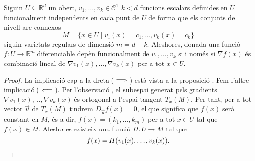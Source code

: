 \documentclass[../Apunts.tex]{subfiles}
\begin{document}
	\begin{proposition}
		Siguin \(U\subseteq\mathbb{R}^{d}\) un obert, \(v_{1},\dots,v_{k}\in\mathcal{C}^{1}\) \(k<d\) funcions escalars definides en \(U\) funcionalment independents en cada punt de \(U\) de forma que els conjunts de nivell arc-connexos
		\[M=\{x\in U\mid v_{1}(x)=c_{1},\dots,v_{k}(x)=c_{k}\}\]
		siguin varietats regulars de dimensió \(m=d-k\). Aleshores, donada una funció \(f\colon U\to\mathbb{R}^{m}\) diferenciable depèn funcionalment de \(v_{1},\dots,v_{k}\) si i només si \(\nabla f(x)\) és combinació lineal de \(\nabla v_{1}(x),\dots,\nabla v_{k}(x)\) per a tot \(x\in U\).
		\begin{proof}
			La implicació cap a la dreta (\(\implies\)) està vista a la proposició . Fem l'altre implicació (\(\impliedby\)).
			Per l'observació , el subespai generat pels gradients \(\nabla v_{1}(x),\dots,\nabla v_{k}(x)\) és ortogonal a l'espai tangent \(T_{x}(M)\). Per tant, per a tot vector \(\vec{u}\) de \(T_{x}(M)\) tindrem \(D_{\vec{u}}f(x)=0\), el que significa que \(f(x)\) serà constant en \(M\), és a dir, \(f(x)=(k_{1},\dots,k_{m})\) per a tot \(x\in U\) tal que \(f(x)\in M\). Aleshores existeix una funció \(H\colon U\rightarrow M\) tal que
			\[f(x)=H(v_{1}(x),\dots,v_{k}(x)).\qedhere\]
		\end{proof}
	\end{proposition}
\end{document}
